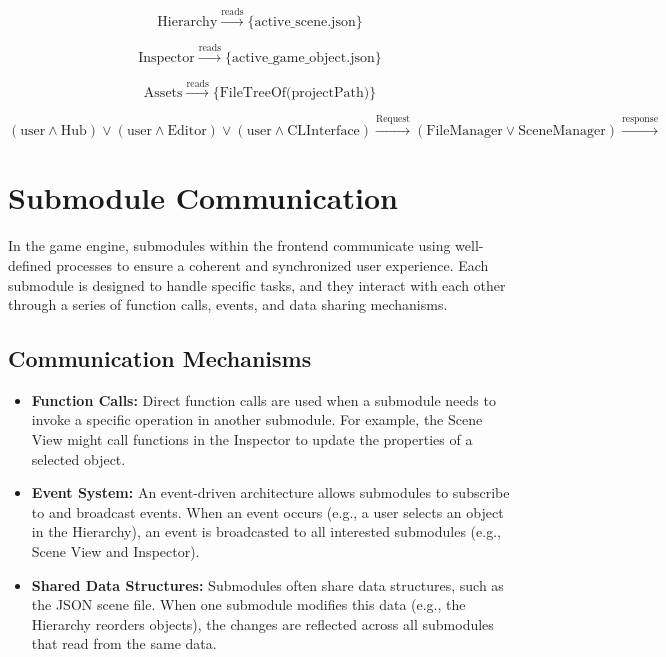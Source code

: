   \[
  \text{Hierarchy} \xrightarrow{\text{reads}} \{\text{active\_scene.json}\}
  \]
  
  \[
  \text{Inspector} \xrightarrow{\text{reads}} \{\text{active\_game\_object.json}\}
  \]
  
  \[
  \text{Assets} \xrightarrow{\text{reads}} \{\text{FileTreeOf(projectPath)}\}
  \]
  
  \[
  (\text{user} \land \text{Hub}) \lor (\text{user} \land \text{Editor}) \lor (\text{user} \land \text{CLInterface}) \xrightarrow{\text{Request}} (\text{FileManager} \lor \text{SceneManager})
  \xrightarrow{\text{response}}
  \]
  







  \pagebreak

\section*{Submodule Communication}

In the game engine, submodules within the frontend communicate using well-defined processes to ensure a coherent and synchronized user experience. Each submodule is designed to handle specific tasks, and they interact with each other through a series of function calls, events, and data sharing mechanisms.

\subsection*{Communication Mechanisms}

\begin{itemize}
    \item \textbf{Function Calls:} Direct function calls are used when a submodule needs to invoke a specific operation in another submodule. For example, the Scene View might call functions in the Inspector to update the properties of a selected object.
    \item \textbf{Event System:} An event-driven architecture allows submodules to subscribe to and broadcast events. When an event occurs (e.g., a user selects an object in the Hierarchy), an event is broadcasted to all interested submodules (e.g., Scene View and Inspector).
    \item \textbf{Shared Data Structures:} Submodules often share data structures, such as the JSON scene file. When one submodule modifies this data (e.g., the Hierarchy reorders objects), the changes are reflected across all submodules that read from the same data.
\end{itemize}

